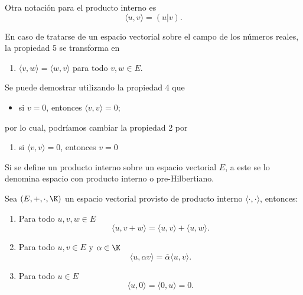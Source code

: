 \documentclass[a4,11pt]{aleph-notas}
\begin{document}
\begin{advertencia}
    Otra notación para el producto interno es
    \[
        \langle u , v \rangle
        = (u|v).
    \]
\end{advertencia}

\begin{advertencia}
    En caso de tratarse de un espacio vectorial sobre el campo de los números reales, la propiedad 5 se transforma en
    \begin{enumerate}[start=5]
        \item
            $\langle v,w \rangle = \langle w, v \rangle$ para todo $v,w \in E$.
    \end{enumerate}
\end{advertencia}


\begin{advertencia}
    Se puede demostrar utilizando la propiedad 4 que
    \begin{itemize}
        \item
            si $v = 0$, entonces $\langle v,v \rangle = 0$;
    \end{itemize}
    por lo cual, podríamos cambiar la propiedad 2 por
    \begin{enumerate}[start=2]
        \item
            si $\langle v,v \rangle = 0$, entonces $ v = 0$
    \end{enumerate}
\end{advertencia}


Si se define un producto interno sobre un espacio vectorial $E$, a este se lo denomina espacio con producto interno o pre-Hilbertiano. 

\begin{teo}
    Sea $(E,+,\cdot,\K)$ un espacio vectorial provisto de producto interno $\langle \cdot, \cdot \rangle$, entonces:
    \begin{enumerate}
        \item 
            Para todo $u,v,w \in E$ 
            \[\langle u, v+w\rangle = \langle u,v\rangle + \langle u, w \rangle.\]
        \item 
            Para todo $u,v \in E$ y $\alpha \in \K$
            \[\langle u, \alpha v\rangle =  \overline{\alpha}\langle u,v\rangle.\]
        \item
            Para todo $u\in E$ 
            \[\langle u, 0 \rangle =  \langle 0, u \rangle  = 0.\]
    \end{enumerate}
\end{teo}
\end{document}
